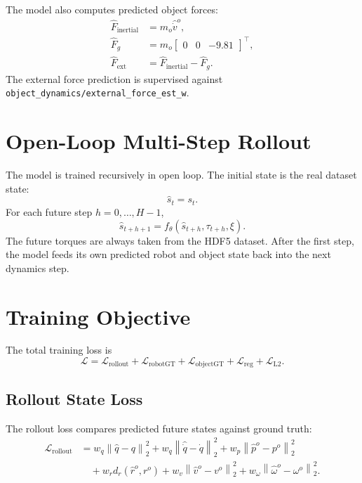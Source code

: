 \documentclass[11pt]{article}
\begin{document}
The model also computes predicted object forces:
\begin{align}
  \hat{F}_{\mathrm{inertial}} &= m_o \hat{\dot{v}}^o, \\
  \hat{F}_{g} &= m_o
  \begin{bmatrix}
    0 & 0 & -9.81
  \end{bmatrix}^{\top}, \\
  \hat{F}_{\mathrm{ext}} &=
  \hat{F}_{\mathrm{inertial}} - \hat{F}_{g}.
\end{align}
The external force prediction is supervised against
\texttt{object\_dynamics/external\_force\_est\_w}.

\section{Open-Loop Multi-Step Rollout}

The model is trained recursively in open loop. The initial state is the real
dataset state:
\begin{equation}
  \hat{s}_t = s_t.
\end{equation}
For each future step \(h=0,\ldots,H-1\),
\begin{equation}
  \hat{s}_{t+h+1}
  =
  f_{\theta}
  \left(
    \hat{s}_{t+h},
    \tau_{t+h},
    \xi
  \right).
\end{equation}
The future torques are always taken from the HDF5 dataset. After the first step,
the model feeds its own predicted robot and object state back into the next
dynamics step.

\section{Training Objective}

The total training loss is
\begin{equation}
  \mathcal{L}
  =
  \mathcal{L}_{\mathrm{rollout}}
  +
  \mathcal{L}_{\mathrm{robotGT}}
  +
  \mathcal{L}_{\mathrm{objectGT}}
  +
  \mathcal{L}_{\mathrm{reg}}
  +
  \mathcal{L}_{\mathrm{L2}}.
\end{equation}

\subsection{Rollout State Loss}

The rollout loss compares predicted future states against ground truth:
\begin{align}
  \mathcal{L}_{\mathrm{rollout}}
  &=
  w_q
  \left\|
    \hat{q} - q
  \right\|_2^2
  +
  w_{\dot{q}}
  \left\|
    \hat{\dot{q}} - \dot{q}
  \right\|_2^2
  +
  w_p
  \left\|
    \hat{p}^o - p^o
  \right\|_2^2 \nonumber \\
  &\quad+
  w_r
  d_r(\hat{r}^o,r^o)
  +
  w_v
  \left\|
    \hat{v}^o - v^o
  \right\|_2^2
  +
  w_{\omega}
  \left\|
    \hat{\omega}^o - \omega^o
  \right\|_2^2.
\end{align}
\end{document}
